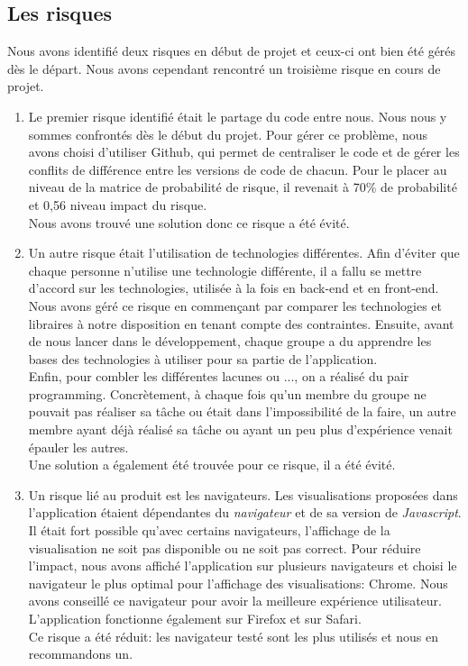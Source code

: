 \documentclass[t, 12pt, usenames,dvipsnames]{article}
\begin{document}
    \subsection{Les risques}
        \noindent Nous avons identifié deux risques en début de projet et ceux-ci ont bien été gérés dès le départ. Nous avons cependant rencontré un troisième risque en cours de projet. 
    
    \begin{enumerate}
        \item  Le premier risque identifié était le partage du code entre nous. Nous nous y sommes confrontés dès le début du projet. Pour gérer ce problème, nous avons choisi d'utiliser Github, qui permet de  centraliser le code et de gérer les conflits de différence entre les versions de code de chacun. Pour le placer au niveau de la matrice de probabilité de risque, il revenait à 70\% de probabilité et 0,56 niveau impact du risque. \\ Nous avons trouvé une solution donc ce risque a été évité.
        \item Un autre risque était l'utilisation de technologies différentes. Afin d'éviter que chaque personne n'utilise une technologie différente, il a fallu se mettre d'accord sur les technologies, utilisée à la fois en back-end et en front-end. Nous avons géré ce risque en commençant par comparer les technologies et libraires à notre disposition en tenant compte des contraintes.
        Ensuite, avant de nous lancer dans le développement, chaque groupe a du apprendre les bases des technologies à utiliser pour sa partie de l'application.\\
        Enfin, pour combler les différentes lacunes ou ..., on a réalisé du pair programming.
        Concrètement, à chaque fois qu'un membre du groupe ne pouvait pas réaliser sa tâche ou était dans l'impossibilité de la faire, un autre membre ayant déjà réalisé sa tâche ou ayant un peu plus d'expérience venait épauler les autres.\\ Une solution a également été trouvée pour ce risque, il a été évité.
        \item Un risque lié au produit est les navigateurs. Les visualisations proposées dans l'application étaient dépendantes du \textit{navigateur} et de sa version de \textit{Javascript}. Il était fort possible qu'avec certains navigateurs, l'affichage de la visualisation ne soit pas disponible ou ne soit pas correct. Pour réduire l'impact, nous avons affiché l'application sur plusieurs navigateurs et choisi le navigateur le plus optimal pour l'affichage des visualisations: Chrome. Nous avons conseillé ce navigateur pour avoir la meilleure expérience utilisateur. L'application fonctionne également sur Firefox et sur Safari.\\ Ce risque a été réduit: les navigateur testé sont les plus utilisés et nous en recommandons un.
    \end{enumerate}
    
\end{document}
